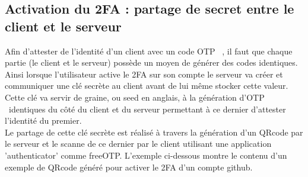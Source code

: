 \documentclass[a4paper, 10pt]{article}
\newcommand{\otp}{\textsc{OTP} }
\begin{document}
        \subsection{Activation du 2FA : partage de secret entre le client et le serveur}

    Afin d'attester de l'identité d'un client avec un code \otp\ , il faut que chaque partie (le client et le serveur) possède \textcolor{myblue}{un moyen de générer des codes identiques}. 
Ainsi lorsque l'utilisateur active le 2FA sur son compte le serveur va créer et \textcolor{mygreen}{communiquer une clé secrète} au client avant de lui même \textcolor{myblue}{stocker} cette valeur.
Cette clé va servir de \textcolor{myblue}{graine}, ou seed en anglais, à la \textcolor{myblue}{génération d'\otp\ identiques} du côté du client et du serveur permettant à ce dernier d'attester l'identité du premier.\\

    Le \textcolor{myblue}{partage} de cette clé secrète est réalisé à travers la génération d'un \textcolor{mygreen}{QRcode} par le serveur et le scanne de ce dernier par le client utilisant une application 'authenticator' comme freeOTP. L'exemple ci-dessous montre le contenu d'un exemple de QRcode généré pour activer le 2FA d'un compte github.\\
\end{document}
